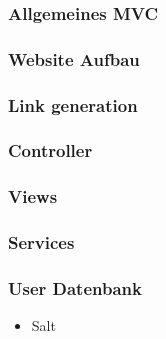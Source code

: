 \documentclass[12pt]{scrartcl}
\begin{document}
\subsubsection{Allgemeines MVC}
\label{sec:allgemein}

\subsubsection{Website Aufbau}
\label{sec:aufbau}
\subsubsection{Link generation}
\label{sec:link}
\subsubsection{Controller}
\label{sec:Controller}
\subsubsection{Views}
\label{sec:Views}
\subsubsection{Services}
\label{sec:Services}
\subsubsection{User Datenbank}
\label{sec:UserDB}
\begin{itemize}
	\item Salt
\end{itemize}
\label{sec:salt}
\end{document}
